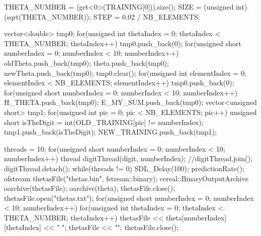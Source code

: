 \documentclass{beamer}
\begin{document}
\begin{casecplusplus}
{    THETA_NUMBER = (get<0>(TRAINING[0])).size();
    SIZE = (unsigned int)(sqrt(THETA_NUMBER));
    STEP = 0.02 / NB_ELEMENTS;

    vector<double> tmp0;
    for(unsigned int thetaIndex = 0; thetaIndex < THETA_NUMBER; thetaIndex++)
        tmp0.push_back(0);
    for(unsigned short numberIndex = 0; numberIndex < 10; numberIndex++)
    {
        oldTheta.push_back(tmp0);
        theta.push_back(tmp0);
        newTheta.push_back(tmp0);
    }
    tmp0.clear();
    for(unsigned int elementIndex = 0; elementIndex < NB_ELEMENTS; elementIndex++)
        tmp0.push_back(0);
    for(unsigned short numberIndex = 0; numberIndex < 10; numberIndex++)
    {
        H_THETA.push_back(tmp0);
        E_MY_SUM.push_back(tmp0);
        vector<unsigned short> tmp1;
        for(unsigned int pic = 0; pic < NB_ELEMENTS; pic++)
        {
            unsigned short isTheDigit = int(OLD_TRAINING[pic] != numberIndex);
            tmp1.push_back(isTheDigit);
        }
        NEW_TRAINING.push_back(tmp1);
    }

    threads = 10;
    for(unsigned short numberIndex = 0; numberIndex < 10; numberIndex++)
    {
        thread digitThread(digit, numberIndex);
        //digitThread.join();
        digitThread.detach();
    }
    while(threads != 0)
        SDL_Delay(100);
    predictionRate();
    ofstream thetasFile("thetas.bin", fstream::binary);
    cereal::BinaryOutputArchive oarchive(thetasFile);
    oarchive(theta);
    thetasFile.close();
    thetasFile.open("thetas.txt");
    for(unsigned short numberIndex = 0; numberIndex < 10; numberIndex++)
    {
        for(unsigned int thetaIndex = 0; thetaIndex < THETA_NUMBER; thetaIndex++)
            thetasFile << theta[numberIndex][thetaIndex] << " ";
        thetasFile << "\n";
    }
    thetasFile.close();
}
\end{casecplusplus}
\end{document}
